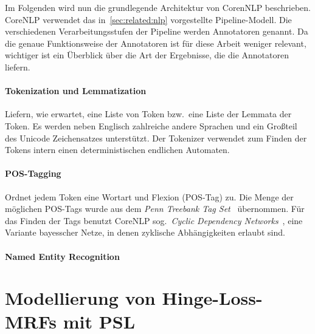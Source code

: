 Im Folgenden wird nun die grundlegende Architektur von CorenNLP beschrieben.
CoreNLP verwendet das in~\ref{sec:related:nlp} vorgestellte Pipeline-Modell.
Die verschiedenen Verarbeitungsstufen der Pipeline werden Annotatoren genannt.
Da die genaue Funktionsweise der Annotatoren ist für diese Arbeit weniger relevant, wichtiger ist ein Überblick über die Art der Ergebnisse, die die Annotatoren liefern.

\paragraph{Tokenization und Lemmatization}
Liefern, wie erwartet, eine Liste von Token bzw.\ eine Liste der Lemmata der Token.
Es werden neben Englisch zahlreiche andere Sprachen und ein Großteil des Unicode Zeichensatzes unterstützt.
Der Tokenizer verwendet zum Finden der Tokens intern einen deterministischen endlichen Automaten.

\paragraph{POS-Tagging}
Ordnet jedem Token eine Wortart und Flexion (POS-Tag) zu.
Die Menge der möglichen POS-Tags wurde aus dem \textit{Penn Treebank Tag Set}~\cite{PennTags} übernommen.
Für das Finden der Tags benutzt CoreNLP sog.\ \textit{Cyclic Dependency Networks}~\cite{Toutanova2003}, eine Variante bayesscher Netze, in denen zyklische Abhängigkeiten erlaubt sind.

\paragraph{Named Entity Recognition}


\section{Modellierung von Hinge-Loss-MRFs mit PSL}%
\label{sec:theory:psl}
